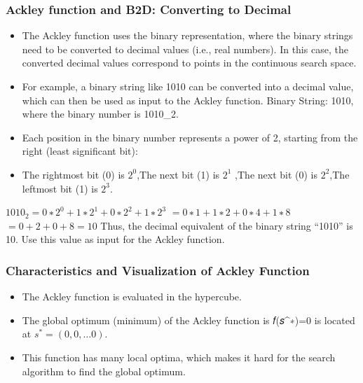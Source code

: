 \documentclass[
  letterpaper,
  DIV=11,
  numbers=noendperiod]{scrreprt}
\providecommand{\tightlist}{%
  \setlength{\itemsep}{0pt}\setlength{\parskip}{0pt}}\usepackage{longtable,booktabs,array}
\begin{document}
\subsubsection{Ackley function and B2D: Converting to
Decimal}\label{ackley-function-and-b2d-converting-to-decimal}

\begin{itemize}
\tightlist
\item
  The Ackley function uses the binary representation, where the binary
  strings need to be converted to decimal values (i.e., real numbers).
  In this case, the converted decimal values correspond to points in the
  continuous search space.
\item
  For example, a binary string like 1010 can be converted into a decimal
  value, which can then be used as input to the Ackley function. Binary
  String: 1010, where the binary number is 1010\_2.
\item
  Each position in the binary number represents a power of 2, starting
  from the right (least significant bit):
\item
  The rightmost bit (0) is \(2^0\),The next bit (1) is \(2^1\) ,The next
  bit (0) is \(2^2\),The leftmost bit (1) is \(2^3\).
\end{itemize}

\(1010_2= 0 ∗ 2^0+ 1 ∗ 2^1 +0 ∗ 2^2+1 ∗ 2^3\)
\(= 0 ∗ 1+ 1 ∗ 2 + 0 ∗ 4 + 1 ∗ 8\) \(=  0 + 2 + 0 + 8 = 10\) Thus, the
decimal equivalent of the binary string ``1010'' is 10. Use this value
as input for the Ackley function.

\subsubsection{Characteristics and Visualization of Ackley
Function}\label{characteristics-and-visualization-of-ackley-function}

\begin{itemize}
\tightlist
\item
  The Ackley function is evaluated in the hypercube.
\item
  The global optimum (minimum) of the Ackley function is 𝑓(𝑠\^{}∗)=0 is
  located at \(s^*=(0,0,…0)\).
\item
  This function has many local optima, which makes it hard for the
  search algorithm to find the global optimum.
\end{itemize}
\end{document}
